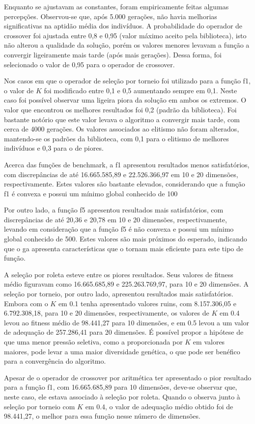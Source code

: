 Enquanto se ajustavam as constantes, foram empiricamente feitas algumas percepções.
Observou-se que, após 5.000 gerações, não havia melhorias significativas na aptidão média dos indivíduos.
A probabilidade do operador de crossover foi ajustada entre 0,8 e 0,95 (valor máximo aceito pela biblioteca), isto não alterou a qualidade da solução, porém os valores menores levavam a função a convergir ligeiramente mais tarde (após mais gerações).
Dessa forma, foi selecionado o valor de 0,95 para o operador de crossover.

Nos casos em que o operador de seleção por torneio foi utilizado para a função \gls{f1}, o valor de \( K \) foi modificado entre 0,1 e 0,5 aumentando sempre em 0,1.
Neste caso foi possível observar uma ligeira piora da solução em ambos os extremos.
O valor que encontrou os melhores resultados foi 0,2 (padrão da biblioteca).
Foi bastante notório que este valor levava o algoritmo a convergir mais tarde, com cerca de 4000 gerações.
Os valores associados ao elitismo não foram alterados, mantendo-se os padrões da biblioteca, com 0,1 para o elitismo de melhores indivíduos e 0,3 para o de piores.

Acerca das funções de benchmark, a \gls{f1} apresentou resultados menos satisfatórios, com discrepâncias de até 16.665.585,89 e 22.526.366,97 em 10 e 20 dimensões, respectivamente.
Estes valores são bastante elevados, considerando que a função \gls{f1} é convexa e possui um mínimo global conhecido de 100

Por outro lado, a função \gls{f5} apresentou resultados mais satisfatórios, com discrepâncias de até 20,36 e 20,78 em 10 e 20 dimensões, respectivamente, levando em consideração que a função \gls{f5} é não convexa e possui um mínimo global conhecido de 500.
Estes valores são mais próximos do esperado, indicando que o \gls{ga} apresenta características que o tornam mais eficiente para este tipo de função.

A seleção por roleta esteve entre os piores resultados. Seus valores de \gls{fitness} médio figuravam como 16.665.685,89 e 225.263.769,97, para 10 e 20 dimensões.
A seleção por torneio, por outro lado, apresentou resultados mais satisfatórios.
Embora com o \( K \) em 0.1 tenha apresentado valores ruins, com 8.157.306,05 e 6.792.308,18, para 10 e 20 dimensões, respectivamente, os valores de \( K \) em 0.4 levou ao \gls{fitness} médio de 98.441,27 para 10 dimensões, e em 0.5 levou a um valor de adequação de 257.286,41 para 20 dimensões.
É possível propor a hipótese de que uma menor pressão seletiva, como a proporcionada por \( K \) em valores maiores, pode levar a uma maior diversidade genética, o que pode ser benéfico para a convergência do algoritmo.

Apesar de o operador de \gls{crossover} por aritmética ter apresentado o pior resultado para a função \gls{f1}, com 16.665.685,89 para 10 dimensões, deve-se observar que, neste caso, ele estava associado à seleção por roleta.
Quando o observa junto à seleção por torneio com \( K \) em 0.4, o valor de adequação médio obtido foi de 98.441,27, o melhor para essa função nesse número de dimensões.